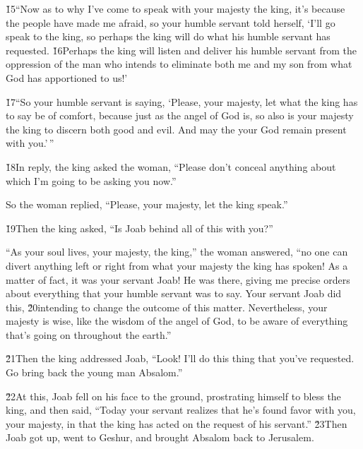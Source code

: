 \v{15}``Now as to why I've come to speak with your majesty the king, it's because the people have made me afraid, so your humble servant told herself, `I'll go speak to the king, so perhaps the king will do what his humble servant has requested. \v{16}Perhaps the king will listen and deliver his humble servant from the oppression of the man who intends to eliminate both me and my son from what God has apportioned to us!'

\v{17}``So your humble servant is saying, `Please, your majesty, let what the king has to say be of comfort, because just as the angel of God is, so also is your majesty the king to discern both good and evil. And may the  your God remain present with you.'\,''

\v{18}In reply, the king asked the woman, ``Please don't conceal anything about which I'm going to be asking you now.''

So the woman replied, ``Please, your majesty, let the king speak.''

\v{19}Then the king asked, ``Is Joab behind all of this with you?''

``As your soul lives, your majesty, the king,'' the woman answered, ``no one can divert anything left or right from what your majesty the king has spoken! As a matter of fact, it was your servant Joab! He was there, giving me precise orders about everything that your humble servant was to say. Your servant Joab did this, \v{20}intending to change the outcome of this matter. Nevertheless, your majesty is wise, like the wisdom of the angel of God, to be aware of everything that's going on throughout the earth.''

\v{21}Then the king addressed Joab, ``Look! I'll do this thing that you've requested. Go bring back the young man Absalom.''

\v{22}At this, Joab fell on his face to the ground, prostrating himself to bless the king, and then said, ``Today your servant realizes that he's found favor with you, your majesty, in that the king has acted on the request of his servant.'' \v{23}Then Joab got up, went to Geshur, and brought Absalom back to Jerusalem.

